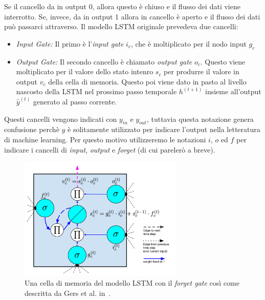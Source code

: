 \begin{itemize}
  Se il cancello da in output 0, allora questo \`e chiuso e il flusso dei dati viene interrotto.
  Se, invece, da in output 1 allora in cancello \`e aperto e il flusso dei dati pu\`o passarci attraverso.
  Il modello LSTM originale prevedeva due cancelli:
  \begin{itemize}
    \item \emph{Input Gate:} Il primo \`e l'\emph{input gate} $i_c$, che \`e moltiplicato per il nodo input $g_c$
    \item \emph{Output Gate:} Il secondo cancello \`e chiamato \emph{output gate} $o_c$.
    Questo viene moltiplicato per il valore dello stato intenro $s_c$ per produrre il valore in output $v_c$ della cella di memoria.
    Questo poi viene dato in pasto al livello nascosto della LSTM nel prossimo passo temporale $h^{(t+1)}$ insieme all'output $\hat{y}^(t)$ generato al passo corrente.
  \end{itemize}
  Questi cancelli vengono indicati con $y_{in}$ e $y_{out}$, tuttavia questa notazione genera confusione perch\`e $y$ \`e solitamente utilizzato per indicare l'output nella letteratura di machine learning.
  Per questo motivo utilizzeremo le notazioni $i$, $o$ ed $f$ per indicare i cancelli di \emph{input}, \emph{output} e \emph{forget} (di cui pareler\`o a breve).
\end{itemize}

\begin{figure}[tp]
  \centering
  \begin{center}
    \includegraphics[width=0.7\textwidth]{./images/memoryCellWithForgetGate.png}
  \end{center}
  \caption{Una cella di memoria del modello LSTM con il \emph{forget gate} cos\`i come descritta da Gers et al. in~\cite{Gers:2000}.}
  \label{fig:memoryCellWithForgetGate}
\end{figure}

